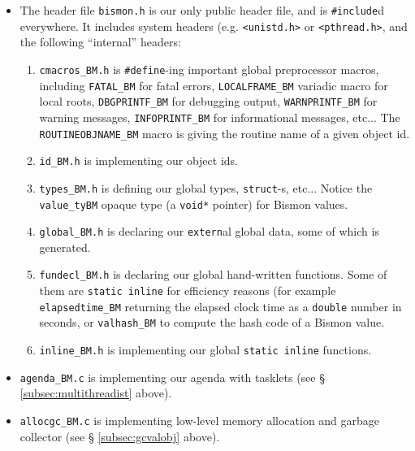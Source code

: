 \begin{itemize}
  \item The header file \texttt{bismon.h} is our only public header file,
    and is \texttt{\#include}d everywhere. It includes system headers (e.g. \texttt{<unistd.h>} or \texttt{<pthread.h>}, and the following ``internal'' headers:
    \begin{enumerate}
      \item \texttt{cmacros_BM.h} is \texttt{\#define}-ing important
        global preprocessor macros, including \texttt{FATAL\_BM} for
        fatal errors, \texttt{LOCALFRAME\_BM} variadic macro for local
        roots, \texttt{DBGPRINTF\_BM} for debugging output,
        \texttt{WARNPRINTF\_BM} for warning messages,
        \texttt{INFOPRINTF\_BM} for informational messages, etc... The
        \texttt{ROUTINEOBJNAME\_BM} macro is giving the routine name of
        a given object id.

      \item \texttt{id\_BM.h} is implementing our object ids.

      \item \texttt{types\_BM.h} is defining our global types,
        \texttt{struct}-s, etc... Notice the \texttt{value\_tyBM}
        opaque type (a \texttt{void*} pointer) for Bismon values.

        \item \texttt{global\_BM.h} is declaring our \texttt{extern}al
          global data, some of which is generated.
        \item \texttt{fundecl\_BM.h} is declaring our global
          hand-written functions. Some of them are \texttt{static
            inline} for efficiency reasons (for example
          \texttt{elapsedtime\_BM} returning the elapsed clock time as
          a \texttt{double} number in seconds, or \texttt{valhash\_BM}
          to compute the hash code of a Bismon value.

        \item \texttt{inline\_BM.h} is implementing our global \texttt{static
            inline} functions.
    \end{enumerate}

  \item \texttt{agenda\_BM.c} is implementing our agenda
     with tasklets  (see \S
    \ref{subsec:multithreadist} above).

  \item \texttt{allocgc\_BM.c} is implementing low-level memory
    allocation and garbage collector  (see \S
    \ref{subsec:gcvalobj} above).
  

\end{itemize}
